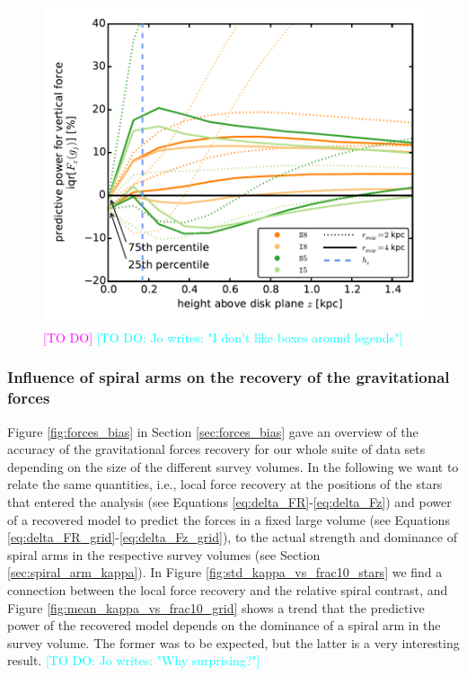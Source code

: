 \documentclass[iop,revtex4,numberedappendix,appendixfloats]{emulateapj}
\newcommand{\Wilma}[1]{\textcolor{Magenta}{#1}}
\newcommand{\Jo}[1]{\textcolor{Cyan}{#1}}
\begin{document}
\begin{figure}[!htbp]
\centering
\includegraphics[width=\columnwidth]{fig/MNdHHdiffSph2_Fg_vs_z.pdf}
\caption{\Wilma{[TO DO]} \Jo{[TO DO: Jo writes: "I don't like boxes around legends"]}}
\label{fig:??}
\end{figure}


\subsubsection{Influence of spiral arms on the recovery of the gravitational forces} \label{sec:spiral_arms_and_forces}

Figure \ref{fig:forces_bias} in Section \ref{sec:forces_bias} gave an overview of the accuracy of the gravitational forces recovery for our whole suite of data sets depending on the size of the different survey volumes. In the following we want to relate the same quantities, i.e., local force recovery at the positions of the stars that entered the analysis (see Equations \eqref{eq:delta_FR}-\eqref{eq:delta_Fz}) and power of a recovered model to predict the forces in a fixed large volume (see Equations \eqref{eq:delta_FR_grid}-\eqref{eq:delta_Fz_grid}), to the actual strength and dominance of spiral arms in the respective survey volumes (see Section \ref{sec:spiral_arm_kappa}). In Figure \ref{fig:std_kappa_vs_frac10_stars} we find a connection between the local force recovery and the relative spiral contrast, and Figure \ref{fig:mean_kappa_vs_frac10_grid} shows a trend that the predictive power of the recovered model depends on the dominance of a spiral arm in the survey volume. The former was to be expected, but the latter is a very interesting result. \Jo{[TO DO: Jo writes: "Why surprising?"]}
\end{document}
